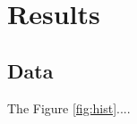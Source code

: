 \documentclass[fleqn,usenatbib, useAMS, a4paper]{mnras}
\begin{document}



\section{Results}\label{sec:results}

\subsection{Data}

The Figure \ref{fig:hist}....
\end{document}

